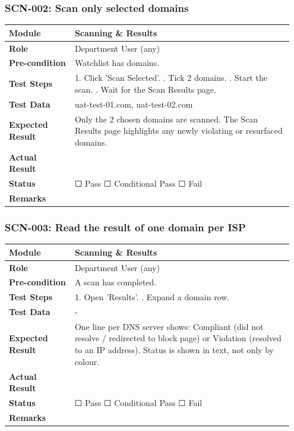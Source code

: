 \documentclass[10pt]{article}
\begin{document}
\subsubsection*{SCN-002: Scan only selected domains}
\begin{longtable}{p{0.22\linewidth}p{0.73\linewidth}}
\hline
\textbf{Module} & Scanning \& Results \\ \hline
\textbf{Role} & Department User (any) \\ \hline
\textbf{Pre-condition} & Watchlist has domains. \\ \hline
\textbf{Test Steps} & 1. Click 'Scan Selected'. \newline 2. Tick 2 domains. \newline 3. Start the scan. \newline 4. Wait for the Scan Results page. \\ \hline
\textbf{Test Data} & uat-test-01.com, uat-test-02.com \\ \hline
\textbf{Expected Result} & Only the 2 chosen domains are scanned. The Scan Results page highlights any newly violating or resurfaced domains. \\ \hline
\textbf{Actual Result} & \newline \newline \\ \hline
\textbf{Status} & ☐ Pass \quad ☐ Conditional Pass \quad ☐ Fail \\ \hline
\textbf{Remarks} & \newline \\ \hline
\end{longtable}
\subsubsection*{SCN-003: Read the result of one domain per ISP}
\begin{longtable}{p{0.22\linewidth}p{0.73\linewidth}}
\hline
\textbf{Module} & Scanning \& Results \\ \hline
\textbf{Role} & Department User (any) \\ \hline
\textbf{Pre-condition} & A scan has completed. \\ \hline
\textbf{Test Steps} & 1. Open 'Results'. \newline 2. Expand a domain row. \\ \hline
\textbf{Test Data} & - \\ \hline
\textbf{Expected Result} & One line per DNS server shows: Compliant (did not resolve / redirected to block page) or Violation (resolved to an IP address). Status is shown in text, not only by colour. \\ \hline
\textbf{Actual Result} & \newline \newline \\ \hline
\textbf{Status} & ☐ Pass \quad ☐ Conditional Pass \quad ☐ Fail \\ \hline
\textbf{Remarks} & \newline \\ \hline
\end{longtable}
\end{document}
